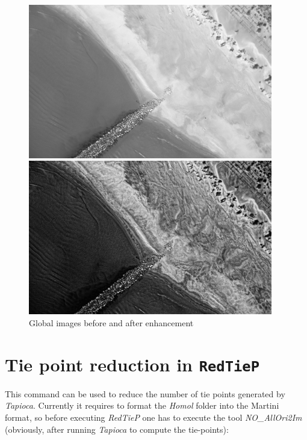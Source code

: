 \begin{figure}
\begin{center}
\includegraphics[width=0.95\textwidth]{FIGS/Tapioca-SFS/Im-STD.jpg}

\includegraphics[width=0.95\textwidth]{FIGS/Tapioca-SFS/Im-SFS.jpg}
\end{center}
\caption{Global images before and after enhancement}
\label{FIG:SF:Img}
\end{figure}


\newpage

\section{Tie point reduction in {\tt RedTieP}}


This command can be used to reduce the number of tie points generated by \textit{Tapioca}. Currently it requires to format the \textit{Homol} folder into the Martini format, so before executing \textit{RedTieP} one has to execute the tool \textit{NO\_AllOri2Im} (obviously, after running \textit{Tapioca} to compute the tie-points):

